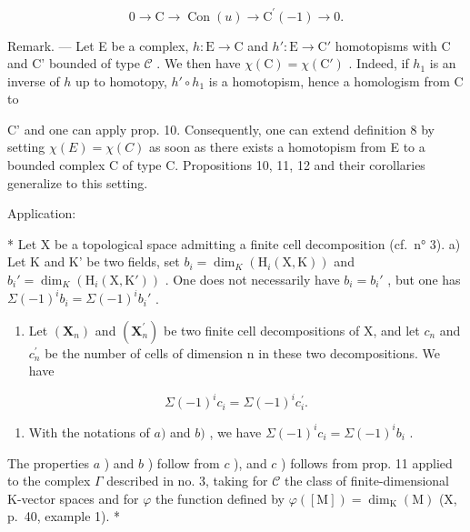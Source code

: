 \[
0 \rightarrow \mathrm{C} \rightarrow \operatorname{Con} (u) \rightarrow \mathrm{C} ^ {\prime} (- 1) \rightarrow 0.
\]

Remark. --- Let E be a complex, \(h: \mathrm{E} \to \mathrm{C}\) and \(h': \mathrm{E} \to \mathrm{C}'\) homotopisms with C and C' bounded of type \(\mathcal{C}\) . We then have \(\chi(\mathrm{C}) = \chi(\mathrm{C}')\) . Indeed, if \(h_1\) is an inverse of \(h\) up to homotopy, \(h' \circ h_1\) is a homotopism, hence a homologism from C to

C' and one can apply prop. 10. Consequently, one can extend definition 8 by setting \(\chi(E) = \chi(C)\) as soon as there exists a homotopism from E to a bounded complex C of type C. Propositions 10, 11, 12 and their corollaries generalize to this setting.

Application:

* Let X be a topological space admitting a finite cell decomposition (cf.~n° 3). a) Let K and K' be two fields, set \(b_i = \dim_K(\mathrm{H}_i(\mathrm{X}, \mathrm{K}))\) and \(b_i' = \dim_K(\mathrm{H}_i(\mathrm{X}, \mathrm{K}'))\) . One does not necessarily have \(b_i = b_i'\) , but one has \(\Sigma(-1)^i b_i = \Sigma(-1)^i b_i'\) .

\begin{enumerate}
\def\labelenumi{\alph{enumi})}
\setcounter{enumi}{1}
\tightlist
\item
  Let \((\mathbf{X}_{n})\) and \((\mathbf{X}_{n}^{\prime})\) be two finite cell decompositions of X, and let \(c_{n}\) and \(c_{n}^{\prime}\) be the number of cells of dimension n in these two decompositions. We have
\end{enumerate}

\[
\Sigma (- 1) ^ {i} c _ {i} = \Sigma (- 1) ^ {i} c _ {i} ^ {\prime}.
\]

\begin{enumerate}
\def\labelenumi{\alph{enumi})}
\setcounter{enumi}{2}
\tightlist
\item
  With the notations of \(a)\) and \(b)\) , we have \(\Sigma(-1)^{i} c_{i} = \Sigma(-1)^{i} b_{i}\) .
\end{enumerate}

The properties \(a\) ) and \(b\) ) follow from \(c\) ), and \(c\) ) follows from prop. 11 applied to the complex \(\Gamma\) described in no. 3, taking for \(\mathscr{C}\) the class of finite-dimensional K-vector spaces and for \(\varphi\) the function defined by \(\varphi([\mathrm{M}]) = \dim_{\mathrm{K}}(\mathrm{M})\) (X, p.~40, example 1). *

